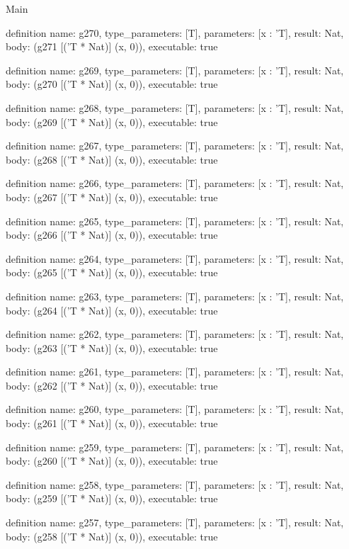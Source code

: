 \begin{lexlean}{Main}
\begin{semanticmodule}
definition{
  name: g270,
  type_parameters: [T],
  parameters: [x : 'T],
  result: Nat,
  body: (g271 [('T * Nat)] (x, 0)),
  executable: true
}

definition{
  name: g269,
  type_parameters: [T],
  parameters: [x : 'T],
  result: Nat,
  body: (g270 [('T * Nat)] (x, 0)),
  executable: true
}

definition{
  name: g268,
  type_parameters: [T],
  parameters: [x : 'T],
  result: Nat,
  body: (g269 [('T * Nat)] (x, 0)),
  executable: true
}

definition{
  name: g267,
  type_parameters: [T],
  parameters: [x : 'T],
  result: Nat,
  body: (g268 [('T * Nat)] (x, 0)),
  executable: true
}

definition{
  name: g266,
  type_parameters: [T],
  parameters: [x : 'T],
  result: Nat,
  body: (g267 [('T * Nat)] (x, 0)),
  executable: true
}

definition{
  name: g265,
  type_parameters: [T],
  parameters: [x : 'T],
  result: Nat,
  body: (g266 [('T * Nat)] (x, 0)),
  executable: true
}

definition{
  name: g264,
  type_parameters: [T],
  parameters: [x : 'T],
  result: Nat,
  body: (g265 [('T * Nat)] (x, 0)),
  executable: true
}

definition{
  name: g263,
  type_parameters: [T],
  parameters: [x : 'T],
  result: Nat,
  body: (g264 [('T * Nat)] (x, 0)),
  executable: true
}

definition{
  name: g262,
  type_parameters: [T],
  parameters: [x : 'T],
  result: Nat,
  body: (g263 [('T * Nat)] (x, 0)),
  executable: true
}

definition{
  name: g261,
  type_parameters: [T],
  parameters: [x : 'T],
  result: Nat,
  body: (g262 [('T * Nat)] (x, 0)),
  executable: true
}

definition{
  name: g260,
  type_parameters: [T],
  parameters: [x : 'T],
  result: Nat,
  body: (g261 [('T * Nat)] (x, 0)),
  executable: true
}

definition{
  name: g259,
  type_parameters: [T],
  parameters: [x : 'T],
  result: Nat,
  body: (g260 [('T * Nat)] (x, 0)),
  executable: true
}

definition{
  name: g258,
  type_parameters: [T],
  parameters: [x : 'T],
  result: Nat,
  body: (g259 [('T * Nat)] (x, 0)),
  executable: true
}

definition{
  name: g257,
  type_parameters: [T],
  parameters: [x : 'T],
  result: Nat,
  body: (g258 [('T * Nat)] (x, 0)),
  executable: true
}


\end{semanticmodule}
\end{lexlean}
